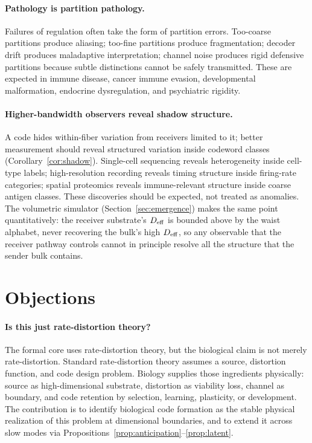 \documentclass[12pt]{article}
\theoremstyle{definition}
\begin{document}
\paragraph{Pathology is partition pathology.} Failures of regulation often take the form of partition errors. Too-coarse partitions produce aliasing; too-fine partitions produce fragmentation; decoder drift produces maladaptive interpretation; channel noise produces rigid defensive partitions because subtle distinctions cannot be safely transmitted. These are expected in immune disease, cancer immune evasion, developmental malformation, endocrine dysregulation, and psychiatric rigidity.

\paragraph{Higher-bandwidth observers reveal shadow structure.} A code hides within-fiber variation from receivers limited to it; better measurement should reveal structured variation inside codeword classes (Corollary~\ref{cor:shadow}). Single-cell sequencing reveals heterogeneity inside cell-type labels; high-resolution recording reveals timing structure inside firing-rate categories; spatial proteomics reveals immune-relevant structure inside coarse antigen classes. These discoveries should be expected, not treated as anomalies. The volumetric simulator (Section~\ref{sec:emergence}) makes the same point quantitatively: the receiver substrate's $D_{\rm eff}$ is bounded above by the waist alphabet, never recovering the bulk's high $D_{\rm eff}$, so any observable that the receiver pathway controls cannot in principle resolve all the structure that the sender bulk contains.

\section{Objections}
\label{sec:objections}

\paragraph{Is this just rate-distortion theory?} The formal core uses rate-distortion theory, but the biological claim is not merely rate-distortion. Standard rate-distortion theory assumes a source, distortion function, and code design problem. Biology supplies those ingredients physically: source as high-dimensional substrate, distortion as viability loss, channel as boundary, and code retention by selection, learning, plasticity, or development. The contribution is to identify biological code formation as the stable physical realization of this problem at dimensional boundaries, and to extend it across slow modes via Propositions~\ref{prop:anticipation}--\ref{prop:latent}.
\end{document}
